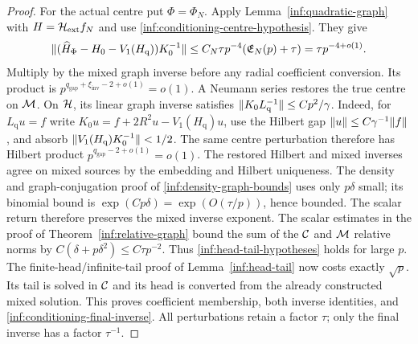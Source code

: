 \begin{proof}
For the actual centre put $\Phi=\Phi_N$. Apply
Lemma~\ref{inf:quadratic-graph} with $H=\mathcal H_{\mathrm{ext}} f_N$ and use
\eqref{inf:conditioning-centre-hypothesis}. They give
\[
 \lVert (\widehat H_\Phi-H_0-V_1(H_{\mathrm q}))K_0^{-1}\rVert
 \le C_N\tau p^{-4}(\mathfrak E_N(p)+\tau)=\tau p^{-4+o(1)}.
\]
Multiply by the mixed graph inverse before any radial coefficient
conversion. Its product is
$p^{q_{\mathrm{gap}}+\xi_{\mathrm{inv}}-2+o(1)}=o(1)$.
A Neumann series restores the true centre on $\mathcal M$.
On $\mathcal{H}$, its linear graph inverse satisfies
$\lVert K_0L_{\mathrm q}^{-1}\rVert\le Cp^2/\gamma$.
Indeed, for $L_{\mathrm q}u=f$ write
$K_0u=f+2R^2u-V_1(H_{\mathrm q})u$, use the Hilbert gap
$\lVert u\rVert\le C\gamma^{-1}\lVert f\rVert$, and absorb
$\lVert V_1(H_{\mathrm q})K_0^{-1}\rVert<1/2$.
The same centre perturbation therefore has Hilbert product
$p^{q_{\mathrm{gap}}-2+o(1)}=o(1)$.
The restored Hilbert and mixed inverses agree on mixed sources
by the embedding and Hilbert uniqueness.
The density and graph-conjugation proof of
\eqref{inf:density-graph-bounds} uses only $p\delta$ small;
its binomial bound is
$\exp(Cp\delta)=\exp(O(\tau/p))$, hence bounded.
The scalar return therefore preserves the mixed inverse exponent.
The scalar estimates in the proof of Theorem~\ref{inf:relative-graph}
bound the sum of the $\mathcal C$ and $\mathcal M$ relative norms by
$C(\delta+p\delta^2)\le C\tau p^{-2}$.
Thus \eqref{inf:head-tail-hypotheses} holds for large $p$.
The finite-head/infinite-tail proof of Lemma~\ref{inf:head-tail}
now costs exactly
$\sqrt p$. Its tail is solved in $\mathcal C$ and its head is converted
from the already constructed mixed solution. This proves
coefficient membership, both inverse identities, and
\eqref{inf:conditioning-final-inverse}.
All perturbations retain a factor $\tau$; only the final inverse
has a factor $\tau^{-1}$.
\end{proof}

